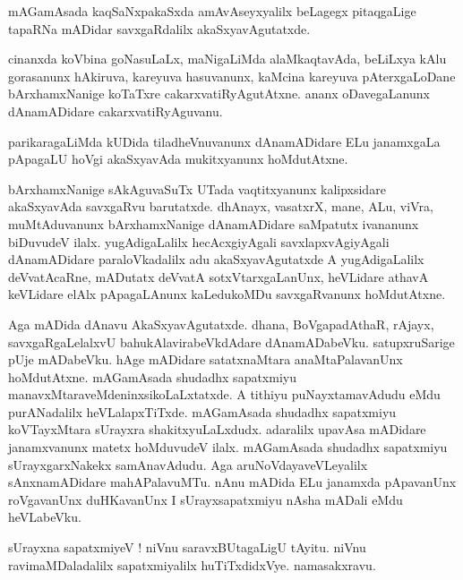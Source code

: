 \documentclass{article}
\begin{document}
\begin{mng}%
mAGamAsada kaqSaNxpakaSxda amAvAseyxyalilx beLagegx pitaqgaLige tapaRNa mADidar savxgaRdalilx 
akaSxyavAgutatxde.
\end{mng}

\begin{mng}%
cinanxda koVbina goNasuLaLx, maNigaLiMda alaMkaqtavAda, beLiLxya kAlu gorasanunx hAkiruva, 
kareyuva hasuvanunx, kaMcina kareyuva pAterxgaLoDane bArxhamxNanige koTaTxre 
cakarxvatiRyAgutAtxne. ananx oDavegaLanunx dAnamADidare cakarxvatiRyAguvanu.
\end{mng}

\begin{mng}%
parikaragaLiMda kUDida tiladheVnuvanunx dAnamADidare ELu janamxgaLa pApagaLU hoVgi akaSxyavAda 
mukitxyanunx hoMdutAtxne.
\end{mng}

\begin{mng}%
bArxhamxNanige sAkAguvaSuTx UTada vaqtitxyanunx kalipxsidare akaSxyavAda savxgaRvu barutatxde. 
dhAnayx, vasatxrX, mane, ALu, viVra, muMtAduvanunx bArxhamxNanige dAnamADidare saMpatutx 
ivananunx biDuvudeV ilalx. yugAdigaLalilx hecAcxgiyAgali savxlapxvAgiyAgali dAnamADidare 
paraloVkadalilx adu akaSxyavAgutatxde A yugAdigaLalilx deVvatAcaRne, mADutatx deVvatA 
sotxVtarxgaLanUnx, heVLidare athavA keVLidare elAlx pApagaLAnunx kaLedukoMDu savxgaRvanunx 
hoMdutAtxne.
\end{mng}

\begin{mng}%
Aga mADida dAnavu AkaSxyavAgutatxde. dhana, BoVgapadAthaR, rAjayx, savxgaRgaLelalxvU 
bahukAlavirabeVkdAdare dAnamADabeVku. satupxruSarige pUje mADabeVku. hAge mADidare satatxnaMtara 
anaMtaPalavanUnx hoMdutAtxne. mAGamAsada shudadhx sapatxmiyu manavxMtaraveMdeninxsikoLaLxtatxde. 
A tithiyu puNayxtamavAdudu eMdu purANadalilx heVLalapxTiTxde. mAGamAsada shudadhx sapatxmiyu 
koVTayxMtara sUrayxra shakitxyuLaLxdudx. adaralilx upavAsa mADidare janamxvanunx matetx 
hoMduvudeV ilalx. mAGamAsada shudadhx sapatxmiyu sUrayxgarxNakekx samAnavAdudu. Aga 
aruNoVdayaveVLeyalilx sAnxnamADidare mahAPalavuMTu. nAnu mADida ELu janamxda pApavanUnx 
roVgavanUnx duHKavanUnx I sUrayxsapatxmiyu nAsha mADali eMdu heVLabeVku.
\end{mng}

\begin{mng}%
sUrayxna sapatxmiyeV ! niVnu saravxBUtagaLigU tAyitu. niVnu ravimaMDaladalilx sapatxmiyalilx 
huTiTxdidxVye. namasakxravu.
\end{mng}
\end{document}
